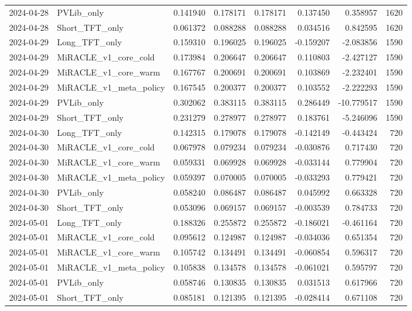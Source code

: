 \begin{tabular}{llrrrrrr}
2024-04-28 & PVLib_only & 0.141940 & 0.178171 & 0.178171 & 0.137450 & 0.358957 & 1620 \\
2024-04-28 & Short_TFT_only & 0.061372 & 0.088288 & 0.088288 & 0.034516 & 0.842595 & 1620 \\
2024-04-29 & Long_TFT_only & 0.159310 & 0.196025 & 0.196025 & -0.159207 & -2.083856 & 1590 \\
2024-04-29 & MiRACLE_v1_core_cold & 0.173984 & 0.206647 & 0.206647 & 0.110803 & -2.427127 & 1590 \\
2024-04-29 & MiRACLE_v1_core_warm & 0.167767 & 0.200691 & 0.200691 & 0.103869 & -2.232401 & 1590 \\
2024-04-29 & MiRACLE_v1_meta_policy & 0.167545 & 0.200377 & 0.200377 & 0.103552 & -2.222293 & 1590 \\
2024-04-29 & PVLib_only & 0.302062 & 0.383115 & 0.383115 & 0.286449 & -10.779517 & 1590 \\
2024-04-29 & Short_TFT_only & 0.231279 & 0.278977 & 0.278977 & 0.183761 & -5.246096 & 1590 \\
2024-04-30 & Long_TFT_only & 0.142315 & 0.179078 & 0.179078 & -0.142149 & -0.443424 & 720 \\
2024-04-30 & MiRACLE_v1_core_cold & 0.067978 & 0.079234 & 0.079234 & -0.030876 & 0.717430 & 720 \\
2024-04-30 & MiRACLE_v1_core_warm & 0.059331 & 0.069928 & 0.069928 & -0.033144 & 0.779904 & 720 \\
2024-04-30 & MiRACLE_v1_meta_policy & 0.059397 & 0.070005 & 0.070005 & -0.033293 & 0.779421 & 720 \\
2024-04-30 & PVLib_only & 0.058240 & 0.086487 & 0.086487 & 0.045992 & 0.663328 & 720 \\
2024-04-30 & Short_TFT_only & 0.053096 & 0.069157 & 0.069157 & -0.003539 & 0.784733 & 720 \\
2024-05-01 & Long_TFT_only & 0.188326 & 0.255872 & 0.255872 & -0.186021 & -0.461164 & 720 \\
2024-05-01 & MiRACLE_v1_core_cold & 0.095612 & 0.124987 & 0.124987 & -0.034036 & 0.651354 & 720 \\
2024-05-01 & MiRACLE_v1_core_warm & 0.105742 & 0.134491 & 0.134491 & -0.060854 & 0.596317 & 720 \\
2024-05-01 & MiRACLE_v1_meta_policy & 0.105838 & 0.134578 & 0.134578 & -0.061021 & 0.595797 & 720 \\
2024-05-01 & PVLib_only & 0.058746 & 0.130835 & 0.130835 & 0.031513 & 0.617966 & 720 \\
2024-05-01 & Short_TFT_only & 0.085181 & 0.121395 & 0.121395 & -0.028414 & 0.671108 & 720 \\

\end{tabular}
